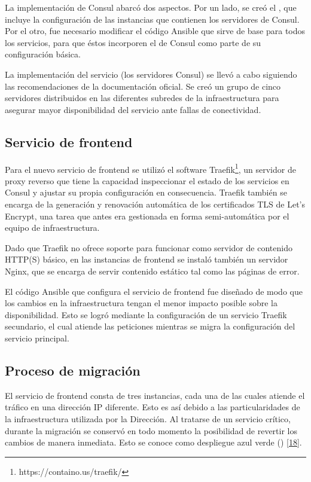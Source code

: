 La implementación de Consul abarcó dos aspectos. Por un lado, se creó
el , que incluye la configuración de las
instancias que contienen los servidores de Consul. Por el otro, fue
necesario modificar el código Ansible que sirve de base para todos los
servicios, para que éstos incorporen el  de Consul como
parte de su configuración básica.

La implementación del servicio (los servidores Consul) se llevó a cabo
siguiendo las recomendaciones de la documentación oficial. Se creó un
grupo de cinco servidores distribuidos en las diferentes subredes de
la infraestructura para asegurar mayor disponibilidad del servicio
ante fallas de conectividad.

\subsection{Servicio de frontend}

Para el nuevo servicio de frontend se utilizó el software
Traefik\footnote{ https://containo.us/traefik/}, un servidor de proxy
reverso que tiene la capacidad inspeccionar el estado de los servicios
en Consul y ajustar su propia configuración en consecuencia. Traefik
también se encarga de la generación y renovación automática de los
certificados TLS de Let’s Encrypt, una tarea que antes era gestionada
en forma semi-automática por el equipo de infraestructura.

Dado que Traefik no ofrece soporte para funcionar como servidor de
contenido HTTP(S) básico, en las instancias de frontend se instaló
también un servidor Nginx, que se encarga de servir contenido estático
tal como las páginas de error.

El código Ansible que configura el servicio de frontend fue diseñado
de modo que los cambios en la infraestructura tengan el menor impacto
posible sobre la disponibilidad. Esto se logró mediante la
configuración de un servicio Traefik secundario, el cual atiende las
peticiones mientras se migra la configuración del servicio principal.

\subsection{Proceso de migración}

El servicio de frontend consta de tres instancias, cada una de las
cuales atiende el tráfico en una dirección IP diferente. Esto es así
debido a las particularidades de la infraestructura utilizada por la
Dirección. Al tratarse de un servicio crítico, durante la migración se
conservó en todo momento la posibilidad de revertir los cambios de
manera inmediata. Esto se conoce como despliegue azul verde
()
\href{https://www.zotero.org/google-docs/?WMXTmt}{[18]}.

